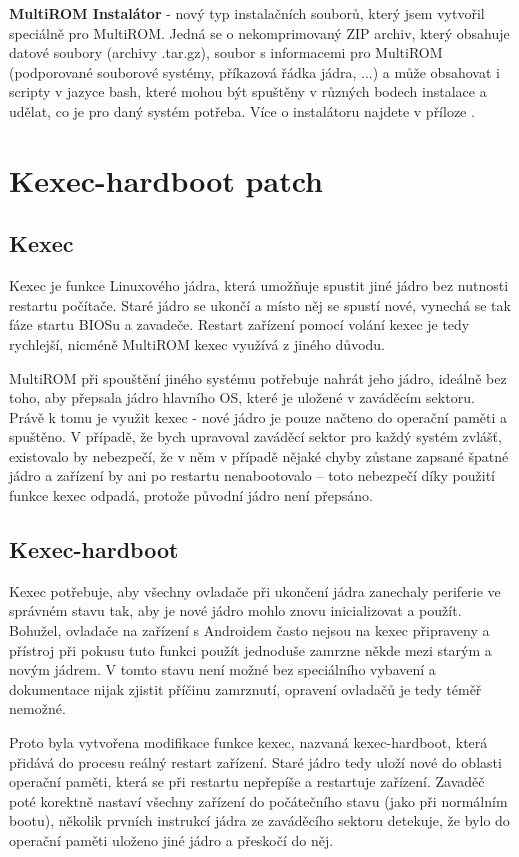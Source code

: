 \documentclass[12pt, a4paper, oneside]{article}
\newcommand{\B}{\textbf} %
\begin{document}
\B{MultiROM Instalátor} - nový typ instalačních souborů, který jsem vytvořil speciálně pro MultiROM. Jedná se o nekomprimovaný ZIP archiv, který obsahuje datové soubory (archivy .tar.gz), soubor s informacemi pro MultiROM (podporované souborové systémy, příkazová řádka jádra, ...) a může obsahovat i scripty v jazyce bash, které mohou být spuštěny v různých bodech instalace a udělat, co je pro daný systém potřeba. Více o instalátoru najdete v příloze .

\section {Kexec-hardboot patch}
\subsection{Kexec}
Kexec je funkce Linuxového jádra, která umožňuje spustit jiné jádro bez nutnosti restartu počítače. Staré jádro se ukončí a místo něj se spustí nové, vynechá se tak fáze startu BIOSu a zavadeče. Restart zařízení pomocí volání kexec je tedy rychlejší, nicméně MultiROM kexec využívá z jiného důvodu.

MultiROM při spouštění jiného systému potřebuje nahrát jeho jádro, ideálně bez toho, aby přepsala jádro hlavního OS, které je uložené v zaváděcím sektoru. Právě k tomu je využit kexec - nové jádro je pouze načteno do operační paměti a spuštěno. V případě, že bych upravoval zaváděcí sektor pro každý systém zvlášť, existovalo by nebezpečí, že v něm v případě nějaké chyby zůstane zapsané špatné jádro a zařízení by ani po restartu nenabootovalo -- toto nebezpečí díky použití funkce kexec odpadá, protože původní jádro není přepsáno.

\subsection{Kexec-hardboot}
Kexec potřebuje, aby všechny ovladače při ukončení jádra zanechaly periferie ve správném stavu tak, aby je nové jádro mohlo znovu inicializovat a použít. Bohužel, ovladače na zařízení s Androidem často nejsou na kexec připraveny a přístroj při pokusu tuto funkci použít jednoduše zamrzne někde mezi starým a novým jádrem. V tomto stavu není možné bez speciálního vybavení a dokumentace nijak zjistit příčinu zamrznutí, opravení ovladačů je tedy téměř nemožné.

Proto byla vytvořena modifikace funkce kexec, nazvaná kexec-hardboot, která přidává do procesu reálný restart zařízení. Staré jádro tedy uloží nové do oblasti operační paměti, která se při restartu nepřepíše a restartuje zařízení. Zavaděč poté korektně nastaví všechny zařízení do počátečního stavu (jako při normálním bootu), několik prvních instrukcí jádra ze zaváděcího sektoru detekuje, že bylo do operační paměti uloženo jiné jádro a přeskočí do něj.
\end{document}
